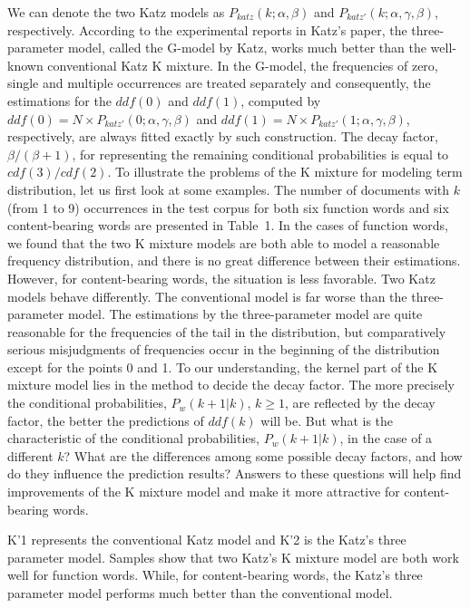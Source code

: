\documentclass[english]{jnlp_1.4_rep}
\begin{document}
We can denote the two Katz models as $P_{\mathit{katz}}(k;\alpha,\beta)$ and $P_{\mathit{katz'}}(k;\alpha,\gamma,\beta)$, respectively. 
\linebreak
According to
the experimental reports in Katz's paper, the three-parameter model, called the G-model by Katz, works much better than the well-known conventional
Katz K mixture. In the G-model, the frequencies of zero, single and multiple occurrences are treated separately and consequently, the estimations
for the $\mathit{ddf}(0)$ and $\mathit{ddf}(1)$, computed by $\mathit{ddf}(0)=N \times P_{\mathit{katz'}}(0;\alpha,\gamma,\beta)$ and
$\mathit{ddf}(1)=N \times P_{\mathit{katz'}}(1;\alpha,\gamma,\beta)$, respectively, are always fitted exactly by such construction. The decay
factor, $\beta / (\beta+1)$, for representing the remaining conditional probabilities is equal to $\mathit{cdf}(3) / \mathit{cdf}(2)$. To illustrate
the problems of the K mixture for modeling term distribution, let us first look at some examples. The number of documents with $k$ (from 1 to 9)
occurrences in the test corpus for both six function words and six content-bearing words are presented in Table~1. In the cases of function words,
we found that the two K mixture models are both able to model a reasonable frequency distribution, and there is no great difference between their
estimations. However, for content-bearing words, the situation is less favorable. Two Katz models behave differently. The conventional model is far
worse than the three-parameter model. The estimations by the three-parameter model are quite reasonable for the frequencies of the tail in the
distribution, but comparatively serious misjudgments of frequencies occur in the beginning of the distribution except for the points 0 and 1. To our
understanding, the kernel part of the K mixture model lies in the method to decide the decay factor. The more precisely the conditional
probabilities, $P_{w}(k+1|k)$, $k\ge 1$, are reflected by the decay factor, the better the predictions of $\mathit{ddf}(k)$ will be. But what is the
characteristic of the conditional probabilities, $P_{w}(k+1|k)$, in the case of a different $k$? What are the differences among some possible decay
factors, and how do they influence the prediction results? Answers to these questions will help find improvements of the K mixture model and make it
more attractive for content-bearing words.

\begin{table}[p]

\vspace{4pt}\small
K'1 represents the conventional Katz model and K'2 is the Katz's three parameter model. Samples show that two Katz's K mixture model are both work well for function words. While, for content-bearing words, the Katz's three parameter model performs much better than the conventional model.
\par
\end{table}
\end{document}
